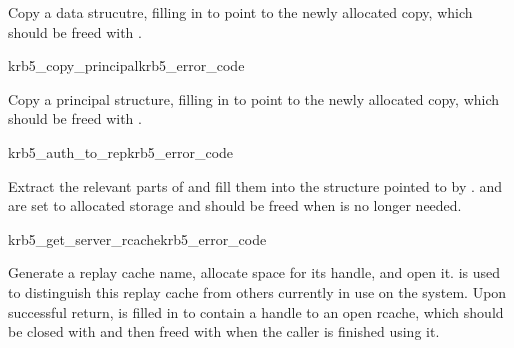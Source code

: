 Copy a data strucutre, filling in  to point to the
newly allocated copy, which should be freed with .

\begin{funcdecl}{krb5_copy_principal}{krb5_error_code}{\funcin}
\funcout
{}
\end{funcdecl}
Copy a principal structure, filling in  to point to
the newly allocated copy, which should be freed with
.

\begin{funcdecl}{krb5_auth_to_rep}{krb5_error_code}{\funcin}
\funcout
{}
\end{funcdecl}
Extract the relevant parts of  and fill them into the
structure pointed to by .  
and  are set to allocated storage and
should be freed when  is no longer needed.

\begin{funcdecl}{krb5_get_server_rcache}{krb5_error_code}{\funcin}
\funcout
{}
\end{funcdecl}
Generate a replay cache name, allocate space for its handle, and open
it.   is used to distinguish this replay cache from
others currently in use on the system.
Upon successful return,  is filled in to contain a
handle to an open rcache, which should be closed with
 and then freed with  when the
caller is finished using it.

